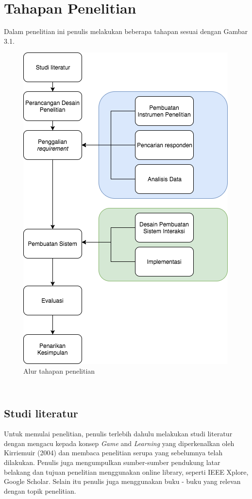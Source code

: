 \section{Tahapan Penelitian}

Dalam penelitian ini penulis melakukan beberapa tahapan sesuai dengan Gambar 3.1.

\begin{figure}
	\includegraphics[scale=0.9]{pics/flow-pembuatan}
	\caption{Alur tahapan penelitian}
	\centering
\end{figure}
\

	\subsection{Studi literatur}
	
	Untuk memulai penelitian, penulis terlebih dahulu melakukan studi literatur dengan
	mengacu kepada konsep \textit{Game} and \textit{Learning} yang
	diperkenalkan oleh Kirriemuir (2004) dan membaca penelitian serupa yang sebelumnya telah dilakukan. Penulis juga mengumpulkan sumber-sumber pendukung latar belakang dan tujuan penelitian menggunakan online library, seperti IEEE Xplore, Google Scholar. Selain itu penulis juga menggunakan buku - buku yang relevan dengan topik penelitian.
	
